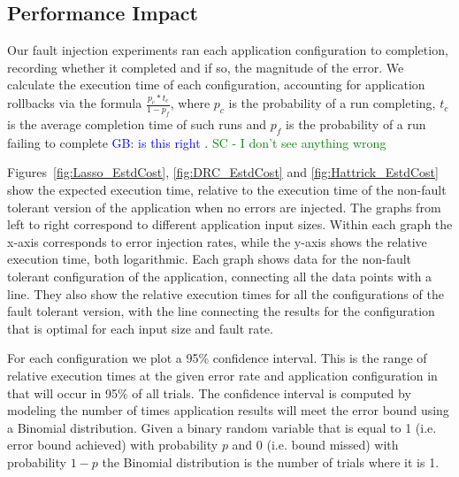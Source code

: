 \documentclass{sig-alternate}
\newcommand{\sui}[1]{%
  \textcolor{green}{SC - #1}
}
\newcommand{\greg}[1]{%
  \textcolor{blue}{GB: #1}
}
\begin{document}

\subsection{Performance Impact}
\label{sec:eval:perf}

Our fault injection experiments ran each application configuration to completion, recording whether it completed and if so, the magnitude of the error.
We calculate the execution time of each configuration, accounting for application rollbacks via the formula $\frac{p_c*t_c}{1-p_f}$, where $p_c$ is the probability of a run completing, $t_c$ is the average completion time of such runs and $p_f$ is the probability of a run failing to complete\greg{is this right}. \sui{I don't see anything wrong}
Figures~\ref{fig:Lasso_EstdCost}, \ref{fig:DRC_EstdCost} and \ref{fig:Hattrick_EstdCost} show the expected execution time, relative to the execution time of the non-fault tolerant version of the application when no errors are injected.
The graphs from left to right correspond to different application input sizes.
Within each graph the x-axis corresponds to error injection rates, while the y-axis shows the relative execution time, both logarithmic.
Each graph shows data for the non-fault tolerant configuration of the application, connecting all the data points with a line.
They also show the relative execution times for all the configurations of the fault tolerant version, with the line connecting the results for the configuration that is optimal for each input size and fault rate.

For each configuration we plot a 95\% confidence interval.
This is the range of relative execution times at the given error rate and application configuration in that will occur in 95\% of all trials.
The confidence interval is computed by modeling the number of times application results will meet the error bound using a Binomial distribution.
Given a binary random variable that is equal to 1 (i.e. error bound achieved) with probability $p$ and 0 (i.e. bound missed) with probability $1-p$ the Binomial distribution is the number of trials where it is 1.
\end{document}
